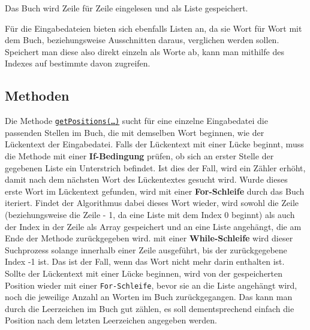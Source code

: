 \documentclass[a4paper, 10pt, ngerman]{scrartcl}
\begin{document}
Das Buch wird Zeile für Zeile eingelesen
und als Liste gespeichert.
		
Für die Eingabedateien bieten sich ebenfalls Listen an,
da sie Wort für Wort mit dem Buch,
beziehungsweise Ausschnitten daraus,
verglichen werden sollen.
Speichert man diese also direkt einzeln als Worte ab,
kann man mithilfe des Indexes auf bestimmte davon zugreifen.

\subsection{Methoden}
Die Methode \hyperref[sec:getPositions()]{\texttt{getPositions(\ldots)}} sucht für eine einzelne Eingabedatei die passenden Stellen im Buch,
die mit demselben Wort beginnen,
wie der Lückentext der Eingabedatei.
Falls der Lückentext mit einer Lücke beginnt,
muss die Methode mit einer \textbf{If-Bedingung} prüfen,
ob sich an erster Stelle der gegebenen Liste ein Unterstrich befindet.
Ist dies der Fall,
wird ein Zähler erhöht,
damit nach dem nächsten Wort des Lückentextes gesucht wird.
Wurde dieses erste Wort im Lückentext gefunden,
wird mit einer \textbf{For-Schleife} durch das Buch iteriert.
Findet der Algorithmus dabei dieses Wort wieder,
wird sowohl die Zeile
(beziehungsweise die Zeile - 1, da eine Liste mit dem Index 0 beginnt)
als auch der Index in der Zeile als Array gespeichert
und an eine Liste angehängt,
die am Ende der Methode zurückgegeben wird.
mit einer \textbf{While-Schleife} wird dieser Suchprozess solange innerhalb einer Zeile ausgeführt,
bis der zurückgegebene Index -1 ist.
Das ist der Fall,
wenn das Wort nicht mehr darin enthalten ist.
Sollte der Lückentext mit einer Lücke beginnen,
wird von der gespeicherten Position wieder mit einer \texttt{For-Schleife},
bevor sie an die Liste angehängt wird,
noch die jeweilige Anzahl an Worten im Buch zurückgegangen.
Das kann man durch die Leerzeichen im Buch gut zählen,
es soll dementsprechend einfach die Position nach dem letzten Leerzeichen angegeben werden.
\end{document}

